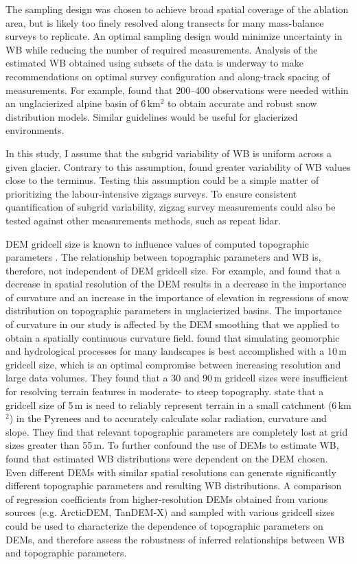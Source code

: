 \documentclass{sfuthesis}
\begin{document}
{The sampling design was chosen to achieve broad spatial coverage of the ablation area, but is likely too finely resolved along transects for many mass-balance surveys to replicate. An optimal sampling design would minimize uncertainty in WB while reducing the number of required measurements. Analysis of the estimated WB obtained using subsets of the data is underway to make recommendations on optimal survey configuration and along-track spacing of measurements. For example, \cite{Lopez2010} found that 200--400 observations were needed within an unglacierized alpine basin of 6\,km$^2$ to obtain accurate and robust snow distribution models. Similar guidelines would be useful for glacierized environments.

In this study, I assume that the subgrid variability of WB is uniform across a given glacier. Contrary to this assumption, \cite{McGrath2015} found greater variability of WB values close to the terminus. Testing this assumption could be a simple matter of prioritizing the labour-intensive zigzags surveys. To ensure consistent quantification of subgrid variability, zigzag survey measurements could also be tested against other measurements methods, such as repeat lidar. 

DEM gridcell size is known to influence values of computed topographic parameters \citep{Zhang1994, Garbrecht1994, Guo-an2001, Lopez2010}. The relationship between topographic parameters and WB is, therefore, not independent of DEM gridcell size. For example, \cite{Kienzle2004} and \cite{Lopez2010} found that a decrease in spatial resolution of the DEM results in a decrease in the importance of curvature and an increase in the importance of elevation in regressions of snow distribution on topographic parameters in unglacierized basins. The importance of curvature in our study is affected by the DEM smoothing that we applied to obtain a spatially continuous curvature field. \cite{Zhang1994} found that simulating geomorphic and hydrological processes for many landscapes is best accomplished with a 10\,m gridcell size, which is an optimal compromise between increasing resolution and large data volumes. They found that a 30 and 90\,m gridcell sizes were insufficient for resolving terrain features in moderate- to steep topography. \cite{Lopez2010} state that a gridcell size of 5\,m is need to reliably represent terrain in a small catchment (6\,km$^2$) in the Pyrenees and to accurately calculate solar radiation, curvature and slope. They find that relevant topographic parameters are completely lost at grid sizes greater than 55\,m. To further confound the use of DEMs to estimate WB, \cite{Molotch2005} found that estimated WB distributions were dependent on the DEM chosen. Even different DEMs with similar spatial resolutions can generate significantly different topographic parameters and resulting WB distributions. A comparison of regression coefficients from higher-resolution DEMs obtained from various sources (e.g. ArcticDEM, TanDEM-X) and sampled with various gridcell sizes could be used to characterize the dependence of topographic parameters on DEMs, and therefore assess the robustness of inferred relationships between WB and topographic parameters. 

}
\end{document}

